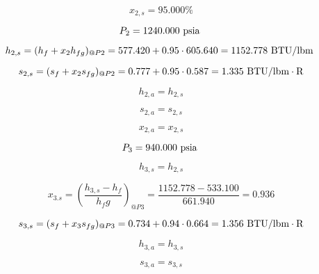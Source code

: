 \documentclass{article}
\begin{document}
\begin{equation}
x_{ 2,s} =   95.000\%
\end{equation}

\begin{equation}
P_{ 2} = 1240.000\textnormal{ psia                      }
\end{equation}

\begin{equation}
  h_{ 2,s} = (h_{f} + x_{ 2}h_{fg})_{@P 2} =  577.420 + 0.95\cdot 605.640 = 1152.778
\textnormal{ BTU/lbm                   }
\end{equation}

\begin{equation}
  s_{ 2,s} = (s_{f} + x_{ 2}s_{fg})_{@P 2} =    0.777 + 0.95\cdot   0.587 =    1.335
\textnormal{ BTU/lbm}\cdot\textnormal{R}
\end{equation}

\begin{equation}
h_{ 2,a} = h_{ 2,s}
\end{equation}

\begin{equation}
s_{ 2,a} = s_{ 2,s}
\end{equation}

\begin{equation}
x_{ 2,a} = x_{ 2,s}
\end{equation}

\begin{equation}
P_{ 3} =  940.000\textnormal{ psia                      }
\end{equation}

\begin{equation}
h_{ 3,s} = h_{ 2,s}
\end{equation}

\begin{equation}
x_{ 3.s} = (\frac{h_{ 3,s} - h_{f}}{h_fg})_{@P 3} = \frac{1152.778 -  533.100}{ 661.940} =    0.936
\end{equation}

\begin{equation}
  s_{ 3,s} = (s_{f} + x_{ 3}s_{fg})_{@P 3} =    0.734 + 0.94\cdot   0.664 =    1.356
\textnormal{ BTU/lbm}\cdot\textnormal{R}
\end{equation}

\begin{equation}
h_{ 3,a} = h_{ 3,s}
\end{equation}

\begin{equation}
s_{ 3,a} = s_{ 3,s}
\end{equation}
\end{document}
